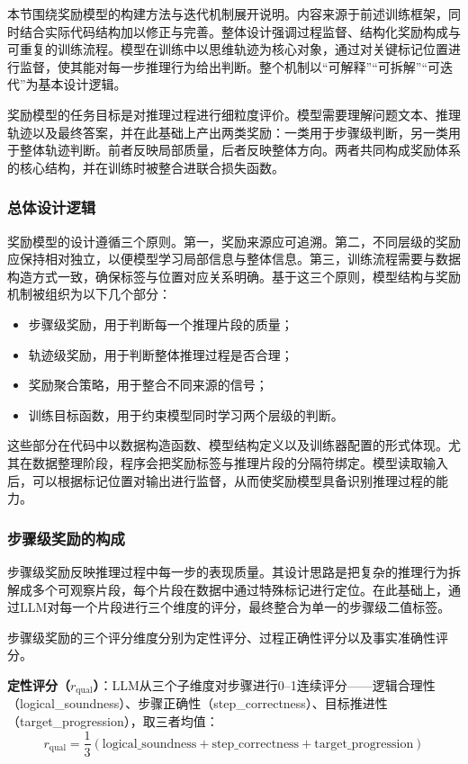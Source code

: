 \documentclass[professional,privacy,print,win,long,STEM,AutoFakeBold]{def/buaa}
\begin{document}
本节围绕奖励模型的构建方法与迭代机制展开说明。内容来源于前述训练框架，同时结合实际代码结构加以修正与完善。整体设计强调过程监督、结构化奖励构成与可重复的训练流程。模型在训练中以思维轨迹为核心对象，通过对关键标记位置进行监督，使其能对每一步推理行为给出判断。整个机制以“可解释”“可拆解”“可迭代”为基本设计逻辑。

奖励模型的任务目标是对推理过程进行细粒度评价。模型需要理解问题文本、推理轨迹以及最终答案，并在此基础上产出两类奖励：一类用于步骤级判断，另一类用于整体轨迹判断。前者反映局部质量，后者反映整体方向。两者共同构成奖励体系的核心结构，并在训练时被整合进联合损失函数。

\subsubsection{总体设计逻辑}

奖励模型的设计遵循三个原则。第一，奖励来源应可追溯。第二，不同层级的奖励应保持相对独立，以便模型学习局部信息与整体信息。第三，训练流程需要与数据构造方式一致，确保标签与位置对应关系明确。基于这三个原则，模型结构与奖励机制被组织为以下几个部分：

\begin{itemize}
    \item 步骤级奖励，用于判断每一个推理片段的质量；
    \item 轨迹级奖励，用于判断整体推理过程是否合理；
    \item 奖励聚合策略，用于整合不同来源的信号；
    \item 训练目标函数，用于约束模型同时学习两个层级的判断。
\end{itemize}

这些部分在代码中以数据构造函数、模型结构定义以及训练器配置的形式体现。尤其在数据整理阶段，程序会把奖励标签与推理片段的分隔符绑定。模型读取输入后，可以根据标记位置对输出进行监督，从而使奖励模型具备识别推理过程的能力。

\subsubsection{步骤级奖励的构成}

步骤级奖励反映推理过程中每一步的表现质量。其设计思路是把复杂的推理行为拆解成多个可观察片段，每个片段在数据中通过特殊标记进行定位。在此基础上，通过LLM对每一个片段进行三个维度的评分，最终整合为单一的步骤级二值标签。

步骤级奖励的三个评分维度分别为定性评分、过程正确性评分以及事实准确性评分。

\textbf{定性评分（\(r_{\mathrm{qual}}\)）}：LLM从三个子维度对步骤进行0--1连续评分——逻辑合理性（logical\_soundness）、步骤正确性（step\_correctness）、目标推进性（target\_progression），取三者均值：
\[
r_{\mathrm{qual}} = \frac{1}{3}(\text{logical\_soundness} + \text{step\_correctness} + \text{target\_progression})
\]
\end{document}
